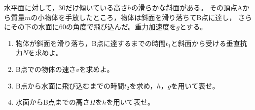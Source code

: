 \item
\begin{mawarikomi}{150pt}{}
    水平面に対して，30\Deg だけ傾いている高さ$h$の滑らかな斜面がある。
    その頂点Aから質量$m$の小物体を手放したところ，物体は斜面を滑り落ちてB点に達し，
    さらにその下の水面に60\Deg の角度で飛び込んだ。重力加速度を$g$とする。
    \begin{enumerate}
        \item 物体が斜面を滑り落ち，B点に達するまでの時間$t_1$と斜面から受ける垂直抗力$N$を求めよ。
        \item B点での物体の速さ$v$を求めよ。
        \item B点から水面に飛び込むまでの時間$t_2$を求め，$h$，$g$を用いて表せ。
        \item 水面からB点までの高さ$H$を$h$を用いて表せ。
    \end{enumerate}
\end{mawarikomi}
